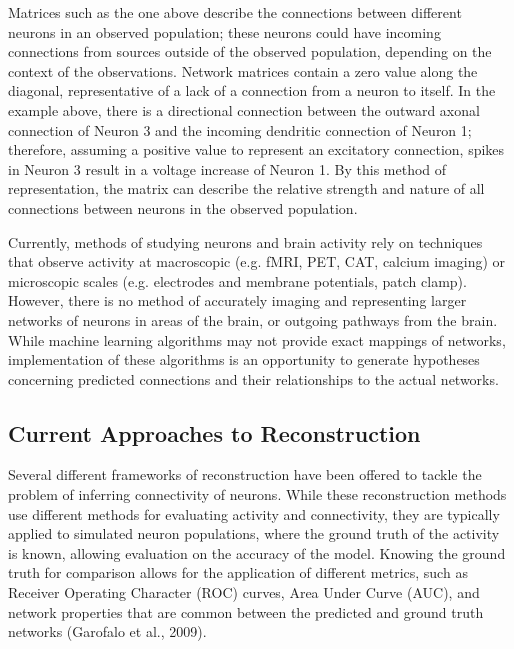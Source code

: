 \documentclass[11pt,titlepage]{article}
\begin{document}
Matrices such as the one above describe the connections between different neurons in an observed population; these neurons could have incoming connections from sources outside of the observed population, depending on the context of the observations. Network matrices contain a zero value along the diagonal, representative of a lack of a connection from a neuron to itself. In the example above, there is a directional connection between the outward axonal connection of Neuron 3 and the incoming dendritic connection of Neuron 1; therefore, assuming a positive value to represent an excitatory connection, spikes in Neuron 3 result in a voltage increase of Neuron 1. By this method of representation, the matrix can describe the relative strength and nature of all connections between neurons in the observed population.\par

Currently, methods of studying neurons and brain activity rely on techniques that observe activity at macroscopic (e.g. fMRI, PET, CAT, calcium imaging) or microscopic scales (e.g. electrodes and membrane potentials, patch clamp). However, there is no method of accurately imaging and representing larger networks of neurons in areas of the brain, or outgoing pathways from the brain. While machine learning algorithms may not provide exact mappings of networks, implementation of these algorithms is an opportunity to generate hypotheses concerning predicted connections and their relationships to the actual networks.\par

\subsection{Current Approaches to Reconstruction}
Several different frameworks of reconstruction have been offered to tackle the problem of inferring connectivity of neurons. While these reconstruction methods use different methods for evaluating activity and connectivity, they are typically applied to simulated neuron populations, where the ground truth of the activity is known, allowing evaluation on the accuracy of the model. Knowing the ground truth for comparison allows for the application of different metrics, such as Receiver Operating Character (ROC) curves, Area Under Curve (AUC), and network properties that are common between the predicted and ground truth networks (Garofalo et al., 2009).\par
\end{document}
